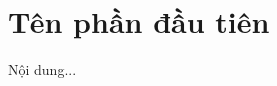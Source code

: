 \documentclass[12pt,a4paper]{article}
\newcommand{\blogfig}[1]{}
\begin{document}
\section{Tên phần đầu tiên}

Nội dung...

\end{document}
